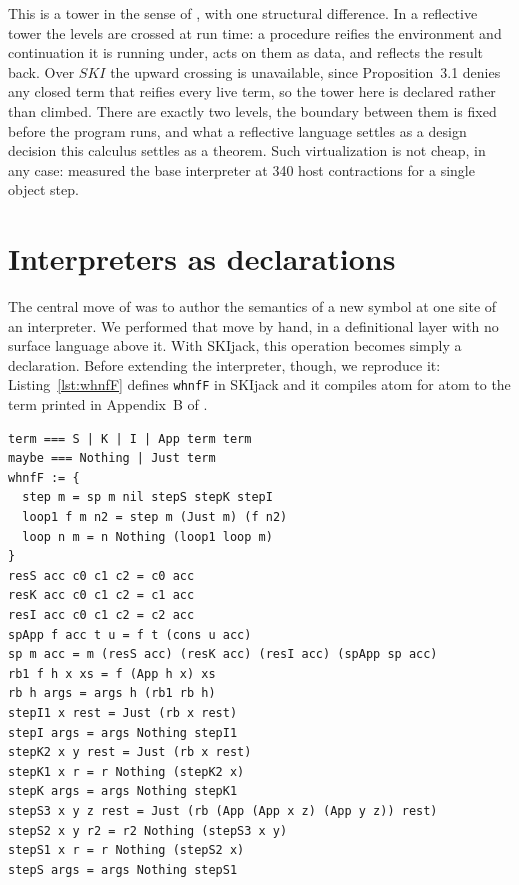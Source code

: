 \documentclass[english,submission,code=tt]{programming}
\begin{document}
This is a tower in the sense of \citet{Smith1984}, with one structural
difference.  In a reflective tower the
levels are crossed at run time: a procedure reifies the environment and
continuation it is running under, acts on them as data, and reflects the
result back.  Over $SKI$ the upward crossing is unavailable, since
Proposition~3.1 denies any closed term that reifies every live term, so
the tower here is declared rather than climbed.  There are exactly two
levels, the boundary between them is fixed before the program runs, and
what a reflective language settles as a design decision this calculus
settles as a theorem.
Such \mbox{virtualization} is not cheap, in any case:
\citet{Davis2027} measured the base interpreter at 340 host 
contractions for a single object step.

\section{Interpreters as declarations}\label{sec:interpreters}

The central move of \citet{Davis2027} was to author the semantics of a 
new symbol at one site of an interpreter. We performed that move by 
hand, in a definitional layer with no surface language above it. With 
SKIjack, this operation becomes simply a declaration. Before extending 
the interpreter, though, we reproduce it: Listing~\ref{lst:whnfF} 
defines \texttt{whnfF} in SKIjack and it compiles atom for atom to the 
term printed in Appendix~B of \citet{Davis2027}.

\begin{lstlisting}[float=htb,
                   label=lst:whnfF,
                   caption={The \texttt{whnfF} function defined in 
                   SKIjack.  Pleasingly, this program produces the 
                   identical $SKI$ artifact as Appendix B of
                   \citet{Davis2027} despite SKIjack not existing at 
                   the time of composition.}]
term === S | K | I | App term term
maybe === Nothing | Just term
whnfF := {
  step m = sp m nil stepS stepK stepI
  loop1 f m n2 = step m (Just m) (f n2)
  loop n m = n Nothing (loop1 loop m)
}
resS acc c0 c1 c2 = c0 acc
resK acc c0 c1 c2 = c1 acc
resI acc c0 c1 c2 = c2 acc
spApp f acc t u = f t (cons u acc)
sp m acc = m (resS acc) (resK acc) (resI acc) (spApp sp acc)
rb1 f h x xs = f (App h x) xs
rb h args = args h (rb1 rb h)
stepI1 x rest = Just (rb x rest)
stepI args = args Nothing stepI1
stepK2 x y rest = Just (rb x rest)
stepK1 x r = r Nothing (stepK2 x)
stepK args = args Nothing stepK1
stepS3 x y z rest = Just (rb (App (App x z) (App y z)) rest)
stepS2 x y r2 = r2 Nothing (stepS3 x y)
stepS1 x r = r Nothing (stepS2 x)
stepS args = args Nothing stepS1
\end{lstlisting}
\end{document}
